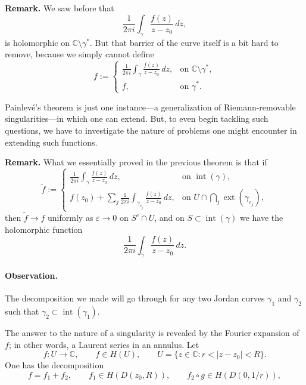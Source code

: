 \documentclass[11pt,a4paper]{article}
\begin{document}
\textbf{Remark.}
We saw before that
\[
\displaystyle \frac{1}{2\pi i}\int_\gamma\frac{f(z)}{z-z_0}\,dz,
\]
is holomorphic on $\mathbb C\setminus\gamma^*$. But that barrier of the curve itself is a bit hard to remove, because we simply cannot define
\[
f:=
\begin{cases}
\displaystyle \frac{1}{2\pi i}\int_\gamma\frac{f(z)}{z-z_0}\,dz,
  &\text{on }\mathbb C\setminus\gamma^*,\\[1.2ex]
f,
  &\text{on }\gamma^*.
\end{cases}
\]

Painlev\'e's theorem is just one instance---a generalization of Riemann-removable singularities---in which one can extend. But, to even begin tackling such questions, we have to investigate the nature of problems one might encounter in extending such functions.

\textbf{Remark.} What we essentially proved in the previous theorem is that if
\[
\widetilde f:=
\begin{cases}
\displaystyle \frac{1}{2\pi i}\int_\gamma\frac{f(z)}{z-z_0}\,dz,
  &\text{on }\operatorname{int}(\gamma),\\[1.2ex]
\displaystyle f(z_0)+\sum_j\frac{1}{2\pi i}
  \int_{\gamma_{c_j}}\frac{f(z)}{z-z_0}\,dz,
  &\text{on }U\cap\bigcap_j\operatorname{ext}(\gamma_{c_j}),
\end{cases}
\]
then $\widetilde f\to f$ uniformly as $\varepsilon\to0$ on $S^c\cap U$, and on $S\subset\operatorname{int}(\gamma)$ we have the holomorphic function
\[
  \frac{1}{2\pi i}\int_\gamma\frac{f(z)}{z-z_0}\,dz.
\]

\paragraph{Observation.} The decomposition we made will go through for any two Jordan curves $\gamma_1$ and $\gamma_2$ such that \(\gamma_2\subset\operatorname{int}(\gamma_1).\)

The answer to the nature of a singularity is revealed by the Fourier expansion of $f$; in other words, a Laurent series in an annulus. Let
\[
  f:U\to\mathbb C,
  \qquad f\in H(U),
  \qquad
  U=\{z\in\mathbb C:r<|z-z_0|<R\}.
\]
One has the decomposition
\[
  f=f_1+f_2,
  \qquad
  f_1\in H(D(z_0,R)),
  \qquad
  f_2\circ g\in H(D(0,1/r)),
\]
\end{document}
